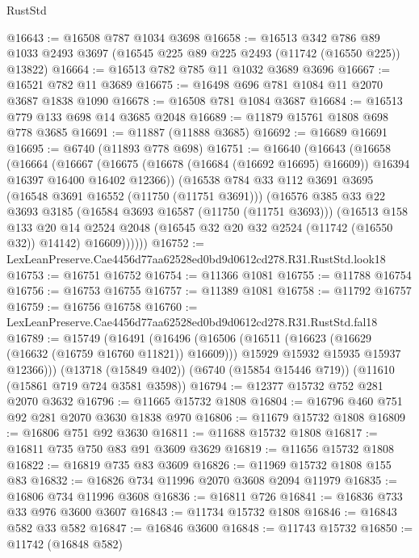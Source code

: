 \begin{lexlean}{RustStd}
\begin{coremodule}
@16643 := @16508 @787 @1034 @3698
@16658 := @16513
    @342
    @786
    @89
    @1033
    @2493
    @3697
    (@16545 @225 @89 @225 @2493 (@11742 (@16550 @225)) @13822)
@16664 := @16513 @782 @785 @11 @1032 @3689 @3696
@16667 := @16521 @782 @11 @3689
@16675 := @16498 @696 @781 @1084 @11 @2070 @3687 @1838 @1090
@16678 := @16508 @781 @1084 @3687
@16684 := @16513 @779 @133 @698 @14 @3685 @2048
@16689 := @11879 @15761 @1808 @698 @778 @3685
@16691 := @11887 (@11888 @3685)
@16692 := @16689 @16691
@16695 := @6740 (@11893 @778 @698)
@16751 := @16640
    (@16643
      (@16658
        (@16664
          (@16667
            (@16675 (@16678 (@16684 (@16692 @16695) @16609)) @16394 @16397 @16400 @16402 @12366))
          (@16538
            @784
            @33
            @112
            @3691
            @3695
            (@16548 @3691 @16552 (@11750 (@11751 @3691)))
            (@16576
              @385
              @33
              @22
              @3693
              @3185
              (@16584 @3693 @16587 (@11750 (@11751 @3693)))
              (@16513
                @158
                @133
                @20
                @14
                @2524
                @2048
                (@16545 @32 @20 @32 @2524 (@11742 (@16550 @32)) @14142)
                @16609))))))
@16752 := LexLeanPreserve.Cae4456d77aa62528ed0bd9d0612cd278.R31.RustStd.look18
@16753 := @16751 @16752
@16754 := @11366 @1081
@16755 := @11788 @16754
@16756 := @16753 @16755
@16757 := @11389 @1081
@16758 := @11792 @16757
@16759 := @16756 @16758
@16760 := LexLeanPreserve.Cae4456d77aa62528ed0bd9d0612cd278.R31.RustStd.fal18
@16789 := @15749
    (@16491
      (@16496
        (@16506
          (@16511 (@16623 (@16629 (@16632 (@16759 @16760 @11821)) @16609)))
          @15929
          @15932
          @15935
          @15937
          @12366)))
    (@13718 (@15849 @402))
    (@6740 (@15854 @15446 @719))
    (@11610 (@15861 @719 @724 @3581 @3598))
@16794 := @12377 @15732 @752 @281 @2070 @3632
@16796 := @11665 @15732 @1808
@16804 := @16796 @460 @751 @92 @281 @2070 @3630 @1838 @970
@16806 := @11679 @15732 @1808
@16809 := @16806 @751 @92 @3630
@16811 := @11688 @15732 @1808
@16817 := @16811 @735 @750 @83 @91 @3609 @3629
@16819 := @11656 @15732 @1808
@16822 := @16819 @735 @83 @3609
@16826 := @11969 @15732 @1808 @155 @83
@16832 := @16826 @734 @11996 @2070 @3608 @2094 @11979
@16835 := @16806 @734 @11996 @3608
@16836 := @16811 @726
@16841 := @16836 @733 @33 @976 @3600 @3607
@16843 := @11734 @15732 @1808
@16846 := @16843 @582 @33 @582
@16847 := @16846 @3600
@16848 := @11743 @15732
@16850 := @11742 (@16848 @582)

\end{coremodule}
\end{lexlean}
